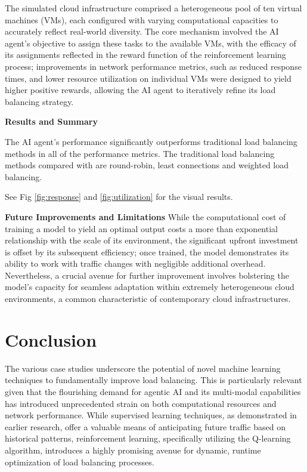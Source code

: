 \documentclass[conference]{IEEEtran}
\begin{document}
The simulated cloud infrastructure comprised a heterogeneous pool of ten virtual machines (VMs), each configured with varying computational capacities to accurately reflect real-world diversity. The core mechanism involved the AI agent's objective to assign these tasks to the available VMs, with the efficacy of its assignments reflected in the reward function of the reinforcement learning process; improvements in network performance metrics, such as reduced response times, and lower resource utilization on individual VMs were designed to yield higher positive rewards, allowing the AI agent to iteratively refine its load balancing strategy.\cite{Kavish_Chawla_2024}

\textbf{Results and Summary}

The AI agent's performance significantly outperforms traditional load balancing methods in all of the performance metrics. The traditional load balancing methods compared with are round-robin, least connections and weighted load balancing.

See Fig \ref{fig:response} and \ref{fig:utilization} for the visual results.

\textbf{Future Improvements and Limitations}
While the computational cost of training a model to yield an optimal output costs a more than exponential relationship with the scale of its environment, the significant upfront investment is offset by its subsequent efficiency; once trained, the model demonstrates its ability to work with traffic changes with negligible additional overhead. Nevertheless, a crucial avenue for further improvement involves bolstering the model's capacity for seamless adaptation within extremely heterogeneous cloud environments, a common characteristic of contemporary cloud infrastructures.

\section{Conclusion}

The various case studies underscore the potential of novel machine learning techniques to fundamentally improve load balancing. This is particularly relevant given that the flourishing demand for agentic AI and its multi-modal capabilities has introduced unprecedented strain on both computational resources and network performance. While supervised learning techniques, as demonstrated in earlier research, offer a valuable means of anticipating future traffic based on historical patterns, reinforcement learning, specifically utilizing the Q-learning algorithm, introduces a highly promising avenue for dynamic, runtime optimization of load balancing processes.
\end{document}

